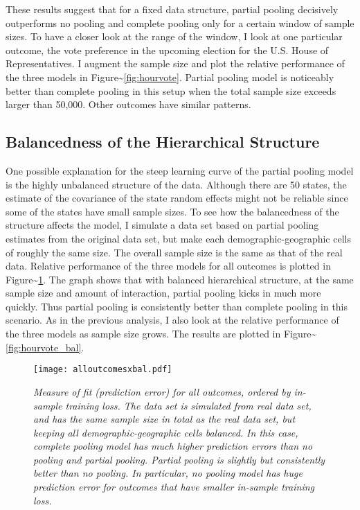 These results suggest that for a fixed data structure, partial pooling
decisively outperforms no pooling and complete pooling only for a
certain window of sample sizes. To have a closer look at the range of
the window, I look at one particular outcome, the vote preference in the
upcoming election for the U.S. House of Representatives. I augment the
sample size and plot the relative performance of the three models in
Figure\textasciitilde{}\ref{fig:hourvote}. Partial pooling model is
noticeably better than complete pooling in this setup when the total
sample size exceeds larger than 50,000. Other outcomes have similar
patterns.

\subsection{Balancedness of the Hierarchical
Structure}\label{balancedness-of-the-hierarchical-structure}

One possible explanation for the steep learning curve of the partial
pooling model is the highly unbalanced structure of the data. Although
there are 50 states, the estimate of the covariance of the state random
effects might not be reliable since some of the states have small sample
sizes. To see how the balancedness of the structure affects the model, I
simulate a data set based on partial pooling estimates from the original
data set, but make each demographic-geographic cells of roughly the same
size. The overall sample size is the same as that of the real data.
Relative performance of the three models for all outcomes is plotted in
Figure\textasciitilde{}\ref{fig:figbal}. The graph shows that with
balanced hierarchical structure, at the same sample size and amount of
interaction, partial pooling kicks in much more quickly. Thus partial
pooling is consistently better than complete pooling in this scenario.
As in the previous analysis, I also look at the relative performance of
the three models as sample size grows. The results are plotted in
Figure\textasciitilde{}\ref{fig:hourvote_bal}.

\begin{figure}[p!]
  \centering
  \texttt{[image: alloutcomesxbal.pdf]}
  \caption{\em Measure of fit (prediction error) for all outcomes, ordered by
    in-sample training loss. The data set is simulated from real data set, and
    has the same sample size in total as the real data set, but keeping all
    demographic-geographic cells balanced. In this case, complete pooling model
    has much higher prediction errors than no pooling and partial
    pooling. Partial pooling is slightly but consistently better than no
    pooling. In particular, no pooling model has huge prediction error for
    outcomes that have smaller in-sample training loss.}
  \label{fig:figbal}
\end{figure}

